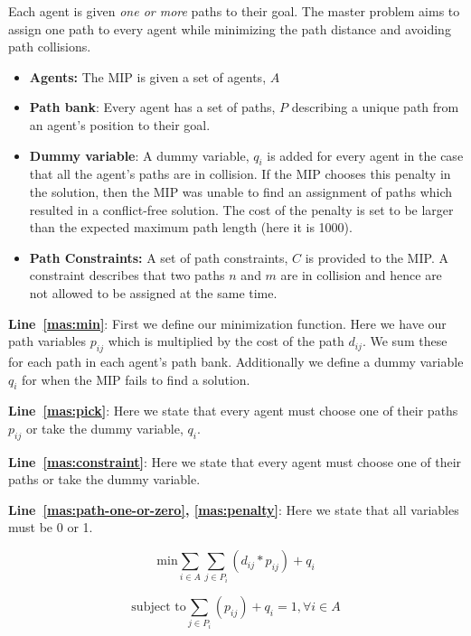\documentclass[a4paper,11pt]{article}
\begin{document}
Each agent is given \textit{one or more} paths to their goal. The master problem aims to assign one path to every agent while minimizing the path distance and avoiding path collisions. 

\begin{itemize}
	\item \textbf{Agents:} The MIP is given a set of agents, $A$
	\item \textbf{Path bank}: Every agent has a set of paths, $P$ describing a unique path from an agent's position to their goal.
	\item \textbf{Dummy variable}: A dummy variable, $q_i$ is added for every agent in the case that all the agent's paths are in collision. If the MIP chooses this penalty in the solution, then the MIP was unable to find an assignment of paths which resulted in a conflict-free solution. The cost of the penalty is set to be larger than the expected maximum path length (here it is 1000).
	\item \textbf{Path Constraints:} A set of path constraints, $C$ is provided to the MIP. A constraint describes that two paths $n$ and $m$ are in collision and hence are not allowed to be assigned at the same time. 
\end{itemize}

\noindent \textbf{Line~\ref{mas:min}}: First we define our minimization function. Here we have our path variables $p_{ij}$ which is multiplied by the cost of the path $d_{ij}$. We sum these for each path in each agent's path bank. Additionally we define a dummy variable $q_i$ for when the MIP fails to find a solution.

\noindent \textbf{Line~\ref{mas:pick}}: Here we state that every agent must choose one of their paths $p_{ij}$ or take the dummy variable, $q_i$.

\noindent \textbf{Line~\ref{mas:constraint}}: Here we state that every agent must choose one of their paths or take the dummy variable.

\noindent \textbf{Line~\ref{mas:path-one-or-zero}, \ref{mas:penalty}}: Here we state that all variables must be 0 or 1.

\begin{equation} \label{mas:min}
\text{min} \sum_{i \in A} \sum_{j \in P_i} (d_{ij} * p_{ij}) + q_i
\end{equation}

\begin{equation} \label{mas:pick} %
\text{subject to} \sum_{j \in P_i} (p_{ij}) + q_i = 1, \forall i \in A
\end{equation}
\end{document}
